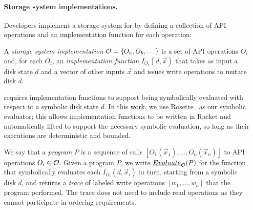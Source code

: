 \paragraph{Storage system implementations.}
Developers implement a storage system for \depsynth
by defining a collection of API operations \sys and an implementation function for each operation:
%
\begin{definition}\label{def:storage-system}
A \emph{storage system implementation} $\mathcal{O} = \{O_a, O_b, \dots\}$
is a set of API operations $O_i$ and,
for each $O_i$,
an \emph{implementation function} $I_{O_i}(d, \vec{x})$
that takes as input a disk state $d$ and a vector of other inputs $\vec{x}$
and issues write operations to mutate disk $d$.
\end{definition}
%
\noindent
\depsynth requires implementation functions to support being symbolically evaluated
with respect to a symbolic disk state $d$.
In this work, we use Rosette~\cite{torlak:rosette} as our symbolic evaluator;
this allows implementation functions to be written in Racket
and automatically lifted to support the necessary symbolic evaluation,
so long as their executions are deterministic and bounded.

We say that a \emph{program} $P$ is a sequence of calls $[O_1(\vec{x}_1), \dots, O_n(\vec{x}_n)]$
to API operations $O_i \in \mathcal{O}$.
Given a program $P$,
we write $\emph{Evaluate}_{\mathcal{O}}(P)$ for the function that symbolically evaluates each $I_{O_i}(d, \vec{x}_i)$ in turn,
starting from a symbolic disk $d$,
and returns a \emph{trace} of labeled write operations $[w_1, \dots, w_n]$ that the program performed.
The trace does not need to include read operations
as they cannot participate in ordering requirements.


